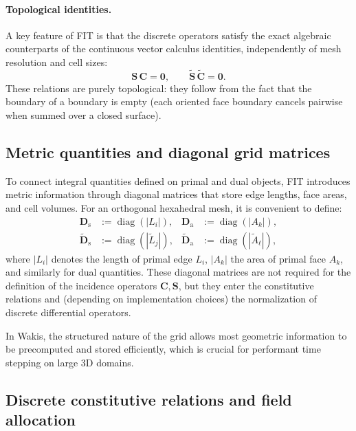 \paragraph{Topological identities.}
A key feature of FIT is that the discrete operators satisfy the exact algebraic counterparts of the continuous vector calculus identities, independently of mesh resolution and cell sizes:
\begin{equation}
\mathbf{S}\,\mathbf{C} = \mathbf{0}, \qquad
\tilde{\mathbf{S}}\,\tilde{\mathbf{C}} = \mathbf{0}.
\label{eq:topological_identities}
\end{equation}
These relations are purely topological: they follow from the fact that the boundary of a boundary is empty (each oriented face boundary cancels pairwise when summed over a closed surface).

\subsection{Metric quantities and diagonal grid matrices}
\label{sec:mge_metric_matrices}

To connect integral quantities defined on primal and dual objects, FIT introduces metric information through diagonal matrices that store edge lengths, face areas, and cell volumes. For an orthogonal hexahedral mesh, it is convenient to define:
\begin{align}
\mathbf{D}_{\mathrm{s}} &:= \operatorname{diag}\left( |L_i| \right),
&
\mathbf{D}_{\mathrm{a}} &:= \operatorname{diag}\left( |A_k| \right), \label{eq:Ds_Da_primal}\\
\tilde{\mathbf{D}}_{\mathrm{s}} &:= \operatorname{diag}\left( |\tilde L_j| \right),
&
\tilde{\mathbf{D}}_{\mathrm{a}} &:= \operatorname{diag}\left( |\tilde A_\ell| \right), \label{eq:Ds_Da_dual}
\end{align}
where $|L_i|$ denotes the length of primal edge $L_i$, $|A_k|$ the area of primal face $A_k$, and similarly for dual quantities. These diagonal matrices are not required for the definition of the incidence operators $\mathbf{C},\mathbf{S}$, but they enter the constitutive relations and (depending on implementation choices) the normalization of discrete differential operators.

In Wakis, the structured nature of the grid allows most geometric information to be precomputed and stored efficiently, which is crucial for performant time stepping on large 3D domains.

\subsection{Discrete constitutive relations and field allocation}
\label{sec:mge_constitutive_discrete}

